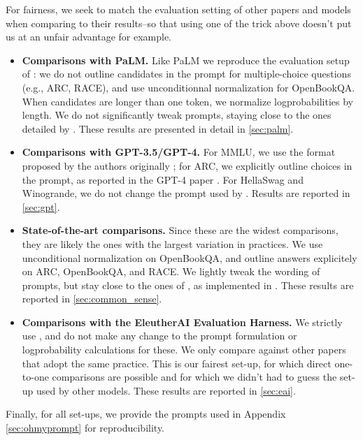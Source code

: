 \documentclass{article}
\begin{document}
\vspace{-0.05in}
For fairness, we seek to match the evaluation setting of other papers and models when comparing to their results--so that using one of the trick above doesn't put us at an unfair advantage for example.
\vspace{-0.1in}

\begin{itemize}
    \item \textbf{Comparisons with PaLM.} Like PaLM \citep{palm, palm-2} we reproduce the evaluation setup of \citet{brown2020gpt3}: we do not outline candidates in the prompt for multiple-choice questions (e.g., ARC, RACE), and use unconditionnal normalization for OpenBookQA. When candidates are longer than one token, we normalize logprobabilities by length. We do not significantly tweak prompts, staying close to the ones detailed by \citet{brown2020gpt3}. These results are presented in detail in \cref{sec:palm}.
    \item \textbf{Comparisons with GPT-3.5/GPT-4.} For MMLU, we use the format proposed by the authors originally \citep{hendrycks2020measuring}; for ARC, we explicitly outline choices in the prompt, as reported in the GPT-4 paper \citep{gpt-4}. For HellaSwag and Winogrande, we do not change the prompt used by \citet{eval-harness}. Results are reported in \cref{sec:gpt}.
    \item \textbf{State-of-the-art comparisons.} Since these are the widest comparisons, they are likely the ones with the largest variation in practices. We use unconditional normalization on OpenBookQA, and outline answers explicitely on ARC, OpenBookQA, and RACE. We lightly tweak the wording of prompts, but stay close to the ones of \citet{brown2020gpt3}, as implemented in \citet{eval-harness}. These results are reported in \cref{sec:common_sense}.
    \item \textbf{Comparisons with the EleutherAI Evaluation Harness.} We strictly use \citet{eval-harness}, and do not make any change to the prompt formulation or logprobability calculations for these. We only compare against other papers that adopt the same practice. This is our fairest set-up, for which direct one-to-one comparisons are possible and for which we didn't had to guess the set-up used by other models. These results are reported in \cref{sec:eai}.
\end{itemize}

\vspace{-0.1in}

Finally, for all set-ups, we provide the prompts used in Appendix \ref{sec:ohmyprompt} for reproducibility.
\end{document}

